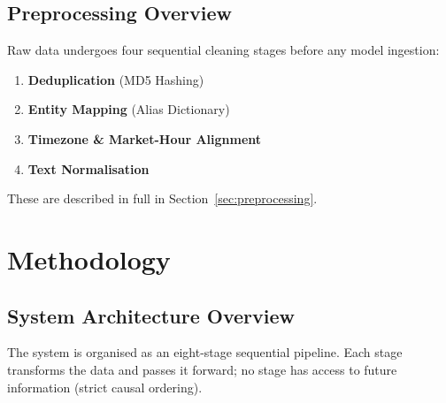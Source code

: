 \documentclass[12pt, a4paper]{article}
\begin{document}
\subsection{Preprocessing Overview}

Raw data undergoes four sequential cleaning stages before any model ingestion:

\begin{enumerate}[leftmargin=2em]
    \item \textbf{Deduplication} (MD5 Hashing)
    \item \textbf{Entity Mapping} (Alias Dictionary)
    \item \textbf{Timezone \& Market-Hour Alignment}
    \item \textbf{Text Normalisation}
\end{enumerate}

These are described in full in Section~\ref{sec:preprocessing}.

\section{Methodology}
\label{sec:methodology}

\subsection{System Architecture Overview}

The system is organised as an eight-stage sequential pipeline. Each stage transforms the data and passes it forward; no stage has access to future information (strict causal ordering).
\end{document}

